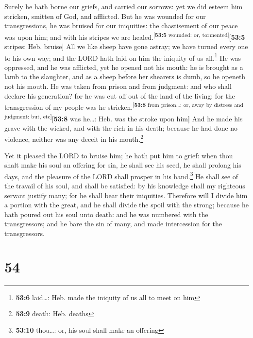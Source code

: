  Surely he hath borne our griefs, and carried our sorrows:
yet we did esteem him stricken, smitten of God, and afflicted.
 But he was wounded for our transgressions, he was bruised
for our iniquities: the chastisement of our peace was upon him; and with
his stripes we are healed.\textsuperscript{{[}\textbf{53:5} wounded: or,
tormented{]}}{[}\textbf{53:5} stripes: Heb. bruise{]}  All
we like sheep have gone astray; we have turned every one to his own way;
and the LORD hath laid on him the iniquity of us all.\footnote{\textbf{53:6}
  laid\ldots: Heb. made the iniquity of us all to meet on him}
 He was oppressed, and he was afflicted, yet he opened not
his mouth: he is brought as a lamb to the slaughter, and as a sheep
before her shearers is dumb, so he openeth not his mouth. 
He was taken from prison and from judgment: and who shall declare his
generation? for he was cut off out of the land of the living: for the
transgression of my people was he
stricken.\textsuperscript{{[}\textbf{53:8} from prison\ldots: or, away
by distress and judgment: but, etc{]}}{[}\textbf{53:8} was he\ldots:
Heb. was the stroke upon him{]}  And he made his grave
with the wicked, and with the rich in his death; because he had done no
violence, neither was any deceit in his mouth.\footnote{\textbf{53:9}
  death: Heb. deaths}

 Yet it pleased the LORD to bruise him; he hath put him
to grief: when thou shalt make his soul an offering for sin, he shall
see his seed, he shall prolong his days, and the pleasure of the LORD
shall prosper in his hand.\footnote{\textbf{53:10} thou\ldots: or, his
  soul shall make an offering}  He shall see of the
travail of his soul, and shall be satisfied: by his knowledge shall my
righteous servant justify many; for he shall bear their iniquities.
 Therefore will I divide him a portion with the great,
and he shall divide the spoil with the strong; because he hath poured
out his soul unto death: and he was numbered with the transgressors; and
he bare the sin of many, and made intercession for the transgressors.

\hypertarget{section-53}{%
\section{54}\label{section-53}}

